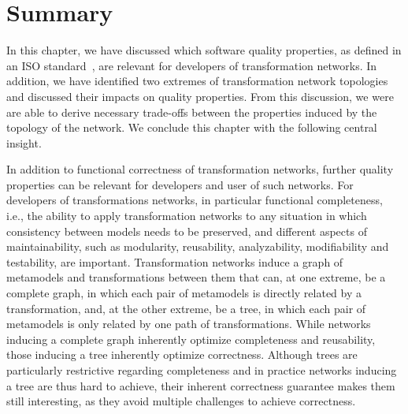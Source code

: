\section{Summary}

In this chapter, we have discussed which software quality properties, as defined in an ISO standard~\cite{iso25010}, are relevant for developers of transformation networks.
In addition, we have identified two extremes of transformation network topologies and discussed their impacts on quality properties.
From this discussion, we were are able to derive necessary trade-offs between the properties induced by the topology of the network.
We conclude this chapter with the following central insight.

\begin{insight}
    In addition to functional correctness of transformation networks, further quality properties can be relevant for developers and user of such networks.
    For developers of transformations networks, in particular functional completeness, i.e., the ability to apply transformation networks to any situation in which consistency between models needs to be preserved, and different aspects of maintainability, such as modularity, reusability, analyzability, modifiability and testability, are important.
    Transformation networks induce a graph of metamodels and transformations between them that can, at one extreme, be a complete graph, in which each pair of metamodels is directly related by a transformation, and, at the other extreme, be a tree, in which each pair of metamodels is only related by one path of transformations.
    While networks inducing a complete graph inherently optimize completeness and reusability, those inducing a tree inherently optimize correctness.
    Although trees are particularly restrictive regarding completeness and in practice networks inducing a tree are thus hard to achieve, their inherent correctness guarantee makes them still interesting, as they avoid multiple challenges to achieve correctness.
\end{insight}